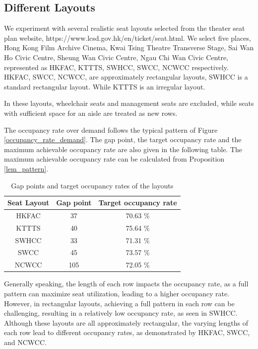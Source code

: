 \subsection*{Different Layouts}
We experiment with several realistic seat layouts selected from the theater seat plan website, https://www.lcsd.gov.hk/en/ticket/seat.html. We select five places, Hong Kong Film Archive Cinema, Kwai Tsing Theatre Transverse Stage, Sai Wan Ho Civic Centre, Sheung Wan Civic Centre, Ngau Chi Wan Civic Centre, represented as HKFAC, KTTTS, SWHCC, SWCC, NCWCC respectively. HKFAC, SWCC, NCWCC, are approximately rectangular layouts, SWHCC is a standard rectangular layout. While KTTTS is an irregular layout.


In these layouts, wheelchair seats and management seats are excluded, while seats with sufficient space for an aisle are treated as new rows. 


The occupancy rate over demand follows the typical pattern of Figure \ref{occupancy_rate_demand}. The gap point, the target occupancy rate and the maximum achievable occupancy rate are also given in the following table. The maximum achievable occupancy rate can be calculated from Proposition \ref{lem_pattern}.

\begin{table}[ht]
  \centering
  \caption{Gap points and target occupancy rates of the layouts}
  \begin{tabular}{|c|c|c|}
  \hline
   Seat Layout & Gap point & Target occupancy rate  \\
   \hline
   HKFAC & 37 & 70.63 \%  \\
   KTTTS & 40 & 75.64 \%   \\
   SWHCC & 33 & 71.31 \%  \\
   SWCC & 45 & 73.57 \%   \\
   NCWCC & 105 & 72.05 \%  \\
   \hline
  \end{tabular}
\end{table}


Generally speaking, the length of each row impacts the occupancy rate, as a full pattern can maximize seat utilization, leading to a higher occupancy rate. However, in rectangular layouts, achieving a full pattern in each row can be challenging, resulting in a relatively low occupancy rate, as seen in SWHCC. Although these layouts are all approximately rectangular, the varying lengths of each row lead to different occupancy rates, as demonstrated by HKFAC, SWCC, and NCWCC.

